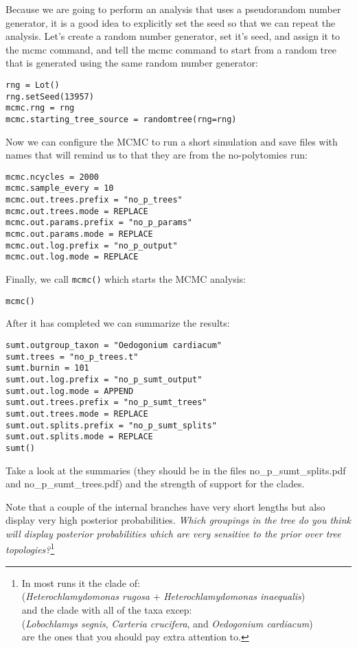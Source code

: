\documentclass{article}
\newcommand{\cmd}[1]{\texttt{#1}\xspace}
\newcommand{\localfile}[1]{\textsf{#1}\xspace}
\newcommand{\QandA}[2]{\textit{#1}\footnote{#2}\xspace}
\begin{document}
Because we are going to perform an analysis that uses a pseudorandom number generator, it is a 
good idea to explicitly set the seed so that we can repeat the analysis.
Let's create a random number generator, set it's seed, and assign it to the mcmc command, and 
tell the mcmc command to start from a random tree that is generated using the same random
number generator:

\begin{verbatim}
rng = Lot()
rng.setSeed(13957)
mcmc.rng = rng
mcmc.starting_tree_source = randomtree(rng=rng)
\end{verbatim}

Now we can configure the MCMC to run a short simulation and save files with names that
will remind us to that they are from the no-polytomies run:
\begin{verbatim}
mcmc.ncycles = 2000
mcmc.sample_every = 10
mcmc.out.trees.prefix = "no_p_trees"
mcmc.out.trees.mode = REPLACE
mcmc.out.params.prefix = "no_p_params"
mcmc.out.params.mode = REPLACE
mcmc.out.log.prefix = "no_p_output"
mcmc.out.log.mode = REPLACE
\end{verbatim}

Finally, we call \cmd{mcmc()} which starts the MCMC analysis:
\begin{verbatim}
mcmc()
\end{verbatim}

After it has completed we can summarize the results:

\begin{verbatim}
sumt.outgroup_taxon = "Oedogonium cardiacum"
sumt.trees = "no_p_trees.t"
sumt.burnin = 101
sumt.out.log.prefix = "no_p_sumt_output"
sumt.out.log.mode = APPEND
sumt.out.trees.prefix = "no_p_sumt_trees"
sumt.out.trees.mode = REPLACE
sumt.out.splits.prefix = "no_p_sumt_splits"
sumt.out.splits.mode = REPLACE
sumt()
\end{verbatim}
Take a look at the summaries (they should be in the files \localfile{no\_p\_sumt\_splits.pdf} and \localfile{no\_p\_sumt\_trees.pdf}) and  the strength of support for the clades.

Note that a couple of the internal branches have very short lengths but 
also display very high posterior probabilities.  
\QandA{Which groupings in the tree do you think will display posterior probabilities
which are very sensitive to the prior over tree topologies?}{In most runs it the clade of:\\ ({\em Heterochlamydomonas rugosa} + {\em Heterochlamydomonas inaequalis})\\ 
and the clade with all of the taxa excep:\\ 
({\em Lobochlamys segnis}, {\em Carteria crucifera}, and {\em Oedogonium cardiacum})\\ 
are the ones that you should pay extra attention to.}
\end{document}
